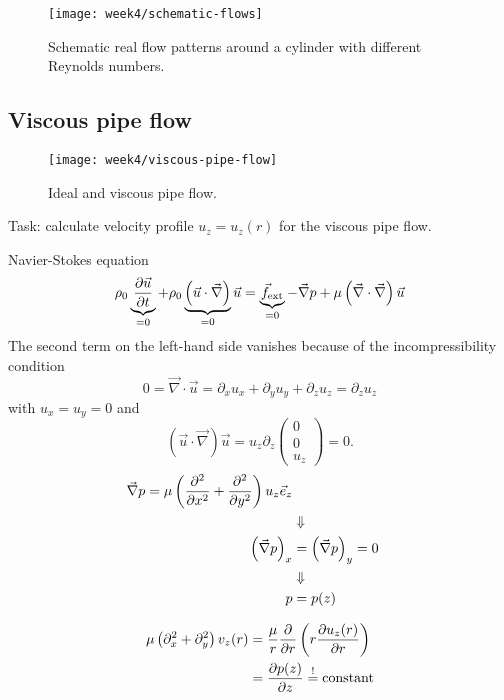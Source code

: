 \begin{figure}[p]
    \centering
    \texttt{[image: week4/schematic-flows]}\\
    \caption{Schematic real flow patterns around a cylinder with different Reynolds numbers.}
    \label{fig:schematic-flows}
\end{figure}


\newpage
\subsection{Viscous pipe flow}

\begin{figure}[ht]
    \centering
    \texttt{[image: week4/viscous-pipe-flow]}\\
    \caption{Ideal and viscous pipe flow.}
    \label{fig:viscous-pipe-flow}
\end{figure}

Task: calculate velocity profile $u_z=u_z(r)$ for the viscous pipe flow.

Navier-Stokes equation
\begin{equation}
\rho_0\underbrace{\frac{\partial \vec{u}}{\partial t}}_{=0}+\rho_0\underbrace{\left(\vec{u}\cdot\vec{\nabla}\right)}_{=0}\vec{u} = \underbrace{\vec{f}_\mathrm{ext}}_{=0}-\vec{\nabla}p+\mu\left(\vec{\nabla}\cdot\vec{\nabla}\right)\vec{u}
\end{equation}
The second term on the left-hand side vanishes because of the incompressibility condition
\begin{equation}
0=\vec{\nabla}\cdot\vec{u}=\partial_xu_x+\partial_yu_y+\partial_zu_z = \partial_zu_z
\end{equation}
with $u_x=u_y=0$ and
\begin{equation}
\left(\vec{u}\cdot\vec{\nabla}\right)\vec{u} = u_z\partial_z
\begin{pmatrix}
0\\0\\u_z
\end{pmatrix} = 0.
\end{equation}
\begin{align}
\vec{\nabla}p = \mu\left(\frac{\partial^2 }{\partial x^2}+\frac{\partial^2 }{\partial y^2}\right)u_z\vec{e}_z\\
&\Downarrow\notag\\
\left(\vec{\nabla}p\right)_x &= \left(\vec{\nabla}p\right)_y = 0 \\
&\Downarrow\notag\\
p &= p(z)
\end{align}

\begin{align}
\mu\left(\partial_x^2+\partial_y^2\right) v_z(r) &= \frac{\mu}{r}\frac{\partial }{\partial r}\left(r\frac{\partial u_z(r)}{\partial r}\right) \\
&= \frac{\partial p(z)}{\partial z} \overset{!}{=} \mathrm{constant}
\end{align}

